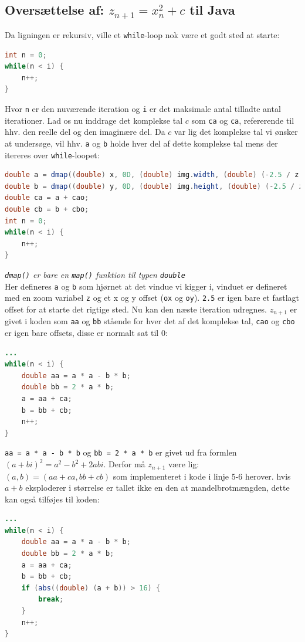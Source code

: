 \documentclass{article}
\begin{document}
\subsection{Oversættelse af: $z_{n+1}=x_n^2+c$ til Java}
Da ligningen er rekursiv, ville et \texttt{while}-loop nok være et godt sted at starte:
\begin{lstlisting}[language=Java]
int n = 0;
while(n < i) {
    n++;
}
\end{lstlisting}
Hvor \texttt{n} er den nuværende iteration og \texttt{i} er det maksimale antal tilladte antal iterationer. Lad os nu inddrage det komplekse tal $c$ som \texttt{ca} og \texttt{ca}, refererende til hhv. den reelle del og den imaginære del. Da $c$ var lig det komplekse tal vi ønsker at undersøge, vil hhv. \texttt{a} og \texttt{b} holde hver del af dette komplekse tal mens der itereres over \texttt{while}-loopet:
\begin{lstlisting}[language=Java]
double a = dmap((double) x, 0D, (double) img.width, (double) (-2.5 / z + ox), (double) (2.5 / z + ox));
double b = dmap((double) y, 0D, (double) img.height, (double) (-2.5 / z + oy), (double) (2.5 / z + oy));
double ca = a + cao;
double cb = b + cbo;
int n = 0;
while(n < i) {
    n++;
}
\end{lstlisting}
\textit{\texttt{dmap()} er bare en \texttt{map()} funktion til typen \texttt{double}}\\
Her defineres \texttt{a} og \texttt{b} som hjørnet at det vindue vi kigger i, vinduet er defineret med en zoom variabel {\texttt{z}} og et x og y offset (\texttt{ox} og \texttt{oy}). \texttt{2.5} er igen bare et fastlagt offset for at starte det rigtige sted. Nu kan den næste iteration udregnes. $z_{n+1}$ er givet i koden som \texttt{aa} og \texttt{bb} stående for hver det af det komplekse tal, \texttt{cao} og \texttt{cbo} er igen bare offsets, disse er normalt sat til 0:
\begin{lstlisting}[language=Java]
...
while(n < i) {
    double aa = a * a - b * b;
    double bb = 2 * a * b;
    a = aa + ca;
    b = bb + cb;
    n++;
}
\end{lstlisting}
\texttt{aa = a * a - b * b} og \texttt{bb = 2 * a * b} er givet ud fra formlen $(a + bi)^2 = a^2 - b^2 + 2abi$. Derfor må $z_{n+1}$ være lig: $(a, b) = (aa + ca, bb + cb)$ som implementeret i kode i linje 5-6 herover. hvis $a+b$ eksploderer i størrelse er tallet ikke en den at mandelbrotmængden, dette kan også tilføjes til koden:
\begin{lstlisting}[language=Java]
...
while(n < i) {
    double aa = a * a - b * b;
    double bb = 2 * a * b;
    a = aa + ca;
    b = bb + cb;
    if (abs((double) (a + b)) > 16) {
        break;
    }
    n++;
}
\end{lstlisting}
\end{document}

